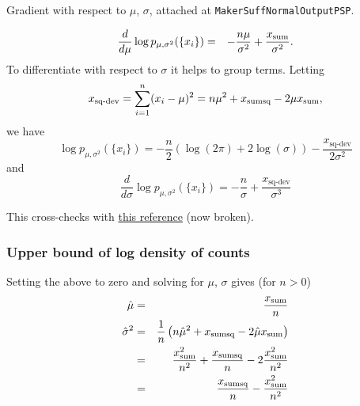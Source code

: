 \documentclass[12pt]{article}
\begin{document}
Gradient with respect to $\mu$, $\sigma$, attached at \texttt{MakerSuffNormalOutputPSP}.

\begin{eqnarray*}
\frac{d}{d\mu} \log p_{\mu,\sigma^2}(\{x_i\}) & = & -\frac{n\mu}{\sigma^2} + 
    \frac{x_{\textrm{sum}}}{\sigma^2}.
\end{eqnarray*}
To differentiate with respect to $\sigma$ it helps to group terms.  Letting
\newcommand{\deviance}{x_{\textrm{sq-dev}}}
\[ \deviance = \sum_{i=1}^n (x_i - \mu)^2 = n\mu^2 + \xsumsq - 2 \mu \xsum, \]
we have
\[ \log p_{\mu,\sigma^2}(\{x_i\}) = -\frac{n}{2}(\log(2\pi) + 2\log(\sigma))
   - \frac{\deviance}{2\sigma^2} \]
and
\[ \frac{d}{d\sigma} \log p_{\mu,\sigma^2}(\{x_i\}) = -\frac{n}{\sigma} + 
    \frac{\deviance}{\sigma^3} \]

This cross-checks with
\href{http://aleph0.clarku.edu/~djoyce/ma218/meeting12.pdf}{this reference} (now broken).

\subsubsection{Upper bound of log density of counts}

Setting the above to zero and solving for $\mu$, $\sigma$ gives (for $n > 0$)
\begin{eqnarray*}
 \hat\mu & = & \frac{x_{\textrm{sum}}}{n} \\
 \hat\sigma^2 & = & \frac{1}{n}\left(n\hat\mu^2 + x_{\textrm{sumsq}} -2\hat\mu x_{\textrm{sum}}\right) \\
  & = & \frac{x_{\textrm{sum}}^2}{n^2} + \frac{x_{\textrm{sumsq}}}{n} - 2\frac{x_{\textrm{sum}}^2}{n^2} \\
  & = & \frac{x_{\textrm{sumsq}}}{n} - \frac{x_{\textrm{sum}}^2}{n^2}
\end{eqnarray*}
\end{document}
